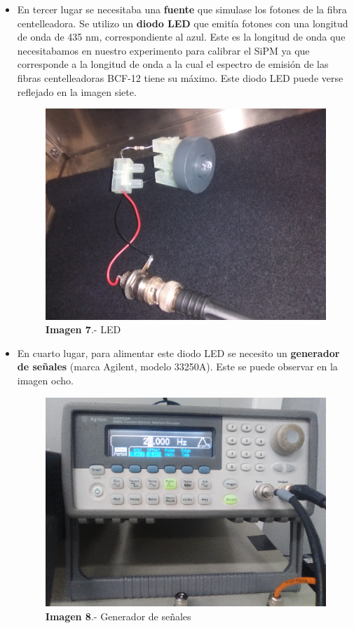 \documentclass[11pt, a4paper]{article}
\begin{document}
\begin{itemize}
\item {} En tercer lugar se necesitaba una \textbf{fuente} que simulase los fotones de la fibra centelleadora. 
\newline
Se utilizo un \textbf{diodo LED} que emitía fotones con una longitud de onda de 435 nm, correspondiente al azul. Este es la longitud de onda que necesitabamos en nuestro experimento para calibrar el SiPM ya que corresponde a la longitud de onda a la cual el espectro de emisión de las fibras centelleadoras BCF-12 tiene su máximo. Este diodo LED puede verse reflejado en la imagen siete.

\begin{figure}[hbtp]
\centering
\includegraphics[scale=0.25]{LED.png}
\caption{\textbf{Imagen 7}.- LED}
\end{figure}

\item {} En cuarto lugar, para alimentar este diodo LED se necesito un \textbf{generador de señales} (marca Agilent, modelo 33250A). Este se puede observar en la imagen ocho.

\begin{figure}[hbtp]
\centering
\includegraphics[scale=0.2]{GeneradorOnda.png}
\caption{\textbf{Imagen 8}.- Generador de señales}
\end{figure}


\end{itemize}
\end{document}
